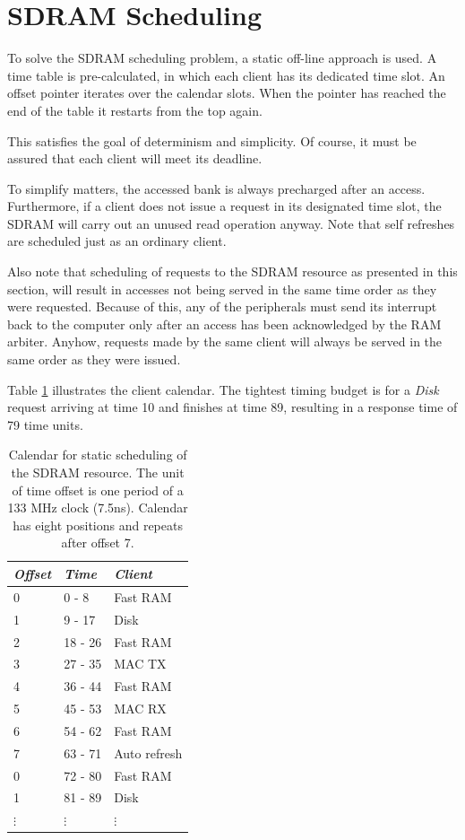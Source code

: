 \documentclass[a4paper]{report}
\begin{document}
\section{SDRAM Scheduling}
To solve the SDRAM scheduling problem, a static off-line
approach is used. A time table is pre-calculated, in which
each client has its dedicated time slot. An offset pointer
iterates over the calendar slots. When the pointer has reached
the end of the table it restarts from the top again.

This satisfies the goal of determinism and simplicity. Of
course, it must be assured that each client will meet its deadline.

To simplify matters, the accessed bank is always precharged
after an access. Furthermore, if a client does not issue a
request in its designated time slot, the SDRAM will carry out
an unused read operation anyway.  Note that self refreshes
are scheduled just as an ordinary client.

Also note that scheduling of requests to the SDRAM
resource as presented in this section, will result in accesses
not being served in the same time order as they were requested.
Because of this, any of the peripherals must send its interrupt
back to the computer only after an access has been acknowledged
by the RAM arbiter.  Anyhow, requests made by the same client
will always be served in the same order as they were issued.

Table \ref{calendar} illustrates the client calendar. The
tightest timing budget is for a \emph{Disk} request
arriving at time 10 and finishes at time 89, resulting in a
response time of 79 time units.

\begin{table}
\begin{tabular}{*3l}    \toprule
\emph{Offset} & \emph{Time}   & \emph{Client} \\
\midrule
0         &  0 -  8     & Fast RAM      \\
1         &  9 - 17     & Disk          \\
2         & 18 - 26     & Fast RAM      \\
3         & 27 - 35     & MAC TX        \\
4         & 36 - 44     & Fast RAM      \\
5         & 45 - 53     & MAC RX        \\
6         & 54 - 62     & Fast RAM      \\
7         & 63 - 71     & Auto refresh  \\
\midrule            
0         & 72 - 80     & Fast RAM      \\
1         & 81 - 89     & Disk          \\
$\vdots$  & $\vdots$    & $\vdots$      \\
\bottomrule
 \hline
\end{tabular}
\caption{Calendar for static scheduling of the SDRAM resource.
The unit of time offset is one period of a 133 MHz clock (7.5ns).
Calendar has eight positions and repeats after offset 7.}
\label{calendar}
\end{table}
\end{document}
